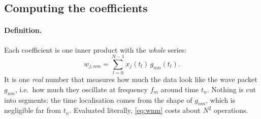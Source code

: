 \documentclass[11pt,a4paper]{article}
\begin{document}
\subsection{Computing the coefficients}\label{sec:wdmalgo}

\paragraph{Definition.} Each coefficient is one inner product with the \emph{whole}
series:
\begin{equation}
  w_{j,nm} = \sum_{l=0}^{N-1} x_j(t_l)\,g_{nm}(t_l).
  \label{eq:wnm}
\end{equation}
It is one \emph{real} number that measures how much the data look like the wave
packet $g_{nm}$, i.e.\ how much they oscillate at frequency $f_m$ around time $t_n$.
Nothing is cut into segments: the time localisation comes from the shape of $g_{nm}$,
which is negligible far from $t_n$. Evaluated literally, \cref{eq:wnm} costs about
$N^2$ operations.
\end{document}

